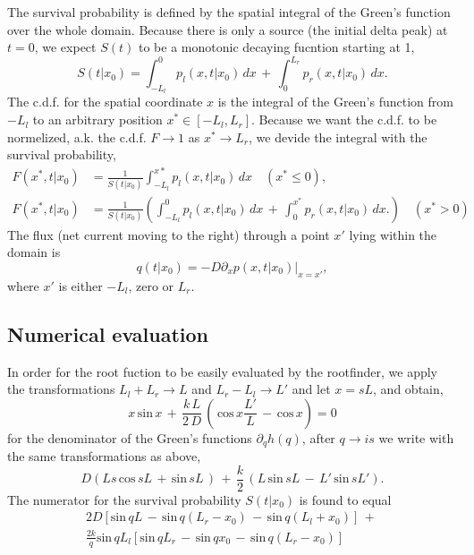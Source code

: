 The survival probability is defined by the spatial integral of the Green's function over the whole domain. Because there is only a source (the initial delta peak) at $t = 0$, we expect $S(t)$ to be a monotonic decaying fucntion starting at 1,
\begin{equation} 
 S(t|x_0) = \int_{-L_l}^{0} p_l(x,t|x_0) \, dx \, + \, \int_{0}^{L_r} p_r(x,t|x_0) \, dx.
\end{equation}
The c.d.f. for the spatial coordinate $x$ is the integral of the Green's function from $-L_l$ to an arbitrary position $x^* \in [-L_l,L_r]$. Because we want the c.d.f. to be normelized, a.k. the c.d.f. $F \rightarrow 1$ as $x^* \rightarrow L_r$, we devide the integral with the survival probability,
\begin{equation}
 \begin{split}
  F(x^*,t|x_0) & = \frac{1}{S(t|x_0)} \int_{-L_l}^{x*} p_l(x,t|x_0) \, dx \quad (x^* \leq 0), \\
  F(x^*,t|x_0) & = \frac{1}{S(t|x_0)} \left( \int_{-L_l}^{0} p_l(x,t|x_0) \, dx \, + \, \int_{0}^{x^*} p_r(x,t|x_0) \, dx. \right) \quad (x^* > 0) 
 \end{split}
\end{equation}
The flux (net current moving to the right) through a point $x'$ lying within the domain is
\begin{equation}
 q(t|x_0) = -D \left. \partial_x p(x,t|x_0) \right|_{x = x'},
\end{equation}
where $x'$ is either $-L_l$, zero or $L_r$.

\subsection{ Numerical evaluation}

In order for the root fuction to be easily evaluated by the rootfinder, we apply the transformations $L_l + L_r \rightarrow L$ and $L_r - L_l \rightarrow L'$ and let $x = s L$, and obtain,
\begin{equation}
 x \, \mathrm{sin} \, x \, + \, \frac{k \, L}{2 \, D} \, \left( \, \mathrm{cos} \, x \frac{L'}{L} \, - \, \mathrm{cos} \, x \right) = 0
\end{equation}
for the denominator of the Green's functions $\partial_q h(q)$, after $q \rightarrow i s$ we write with the same transformations as above,
\begin{equation}
 D \left( L s \, \mathrm{cos} \, s L \, + \, \mathrm{sin} \, s L \, \right) \, + \, \frac{k}{2} \, \left( L \, \mathrm{sin} \, s L \, - \, L' \, \mathrm{sin} \, s L' \right).
\end{equation}
The numerator for the survival probability $S(t|x_0)$ is found to equal
\begin{multline}
2 D \left[ \mathrm{sin} \, q L \, - \, \mathrm{sin} \, q (L_r - x_0) \, - \, \mathrm{sin} \, q (L_l + x_0)  \right] \, + \, \\ 
 \frac{2 k}{q} \mathrm{sin} \, q L_l \left[ \mathrm{sin} \, q L_r \, - \, \mathrm{sin} \, q x_0 \, - \, \mathrm{sin} \, q (L_r - x_0) \right] 
\end{multline}